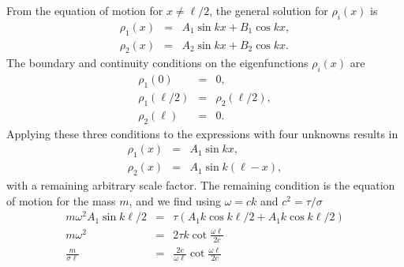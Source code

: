 \documentclass[letterpaper,11pt]{article}
\begin{document}
From the equation of motion for $x \ne \ell/2$, the general solution for $\rho_i(x)$ is
\begin{eqnarray*}
 \rho_1(x) & = & A_1 \sin kx + B_1 \cos kx, \\
 \rho_2(x) & = & A_2 \sin kx + B_2 \cos kx.
\end{eqnarray*}
The boundary and continuity conditions on the eigenfunctions $\rho_i(x)$ are
\begin{eqnarray*}
 \rho_1(0) & = & 0, \\
 \rho_1(\ell/2) & = & \rho_2(\ell/2), \\
 \rho_2(\ell) & = & 0.
\end{eqnarray*}
Applying these three conditions to the expressions with four unknowns results in
\begin{eqnarray*}
 \rho_1(x) & = & A_1 \sin kx, \\
 \rho_2(x) & = & A_1 \sin k(\ell - x),
\end{eqnarray*}
with a remaining arbitrary scale factor.  The remaining condition is the equation of motion for the mass $m$, and we find using $\omega = c k$ and $c^2 = \tau / \sigma$
\begin{eqnarray*}
 m \omega^2 A_1 \sin k\ell/2 & = & \tau (A_1 k\cos k\ell/2 + A_1 k\cos k\ell/2) \\
 m \omega^2 & = & 2 \tau k \cot \frac{\omega \ell}{2 c} \\
 \frac{m}{\sigma \ell} & = & \frac{2 c}{\omega \ell} \cot \frac{\omega \ell}{2 c}
\end{eqnarray*}
\end{document}

